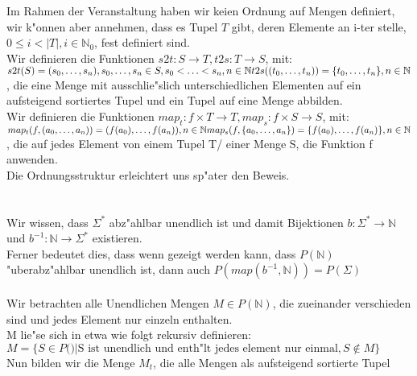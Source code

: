 \documentclass{article}
\newcommand{\gap}{\null\ \\ \\}
\newcommand{\ra}{\rightarrow}
\begin{document}
\subsubsection{}
Im Rahmen der Veranstaltung haben wir keien Ordnung auf Mengen definiert, wir
    k"onnen aber annehmen, dass es Tupel $T$ gibt, deren Elemente an i-ter 
    stelle, $0 \leq i < |T|, i \in \mathbb{N}_0$, fest definiert sind.\\ 
Wir definieren die Funktionen $s2t: S \ra T, t2s: T \ra S$, mit:\\
$
s2t(S) = (s_0, \ldots, s_n), s_0
    , \ldots, s_n \in S, s_0 < \ldots < s_n, n \in \mathbb{N}\\
t2s((t_0, \ldots, t_n)) = \{t_0, \ldots, t_n\}
    ,  n \in \mathbb{N}\\
$, die eine Menge mit ausschlie"slich unterschiedlichen Elementen auf ein 
    aufsteigend sortiertes Tupel und ein Tupel auf eine Menge abbilden.\\
Wir definieren die Funktionen 
    $map_t: f \times T \ra T, map_s: f \times S \ra S$, mit:$\\
map_t(f, (a_0, \ldots, a_n)) = (f(a_0), \ldots, f(a_n)), n \in \mathbb{N}\\
map_s(f, \{a_0, \ldots, a_n\}) = \{f(a_0), \ldots, f(a_n)\}, n \in \mathbb{N}\\
$\\
, die auf jedes Element von einem Tupel T/ einer Menge S, die Funktion f 
    anwenden.\\
Die Ordnungsstruktur erleichtert uns sp"ater den Beweis.\\
\gap
Wir wissen, dass $\Sigma^*$ abz"ahlbar unendlich ist und damit Bijektionen
    $b : \Sigma^* \ra \mathbb{N}$ und $b^{-1} : \mathbb{N} \ra \Sigma^*$ 
    existieren.\\
Ferner bedeutet dies, dass wenn gezeigt werden kann, dass $P(\mathbb{N})$
    "uberabz"ahlbar unendlich ist, dann auch 
    $P(map(b^{-1},\mathbb{N})) = P(\Sigma)$\\
\\
Wir betrachten alle Unendlichen Mengen $M \in P(\mathbb{N})$, die zueinander
    verschieden sind und jedes Element nur einzeln enthalten.\\
M lie"se sich in etwa wie folgt rekursiv definieren:\\
$M = \{S \in P(\mathbb) |
    \text{S ist unendlich und enth"lt jedes element nur einmal}, S \not \in M\}$\\
Nun bilden wir die Menge $M_t$, die alle Mengen als aufsteigend sortierte Tupel
\end{document}
